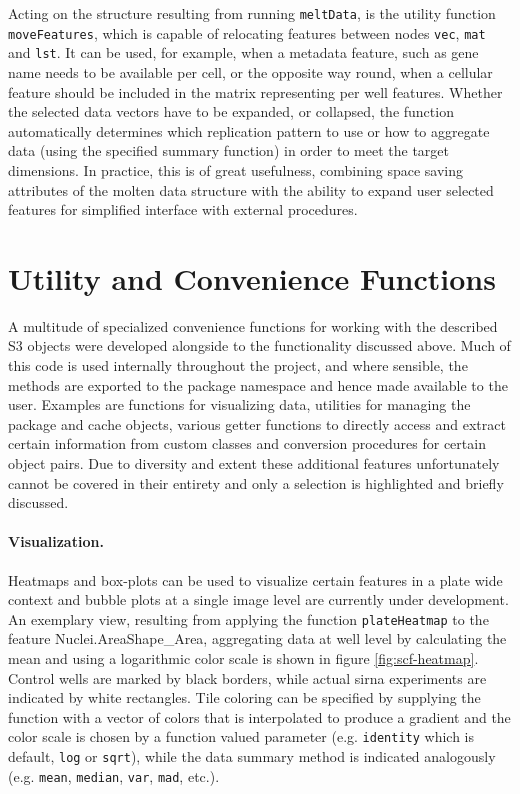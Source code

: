 Acting on the structure resulting from running \texttt{meltData}, is the utility function \texttt{moveFeatures}, which is capable of relocating features between nodes \texttt{vec}, \texttt{mat} and \texttt{lst}. It can be used, for example, when a metadata feature, such as gene name needs to be available per cell, or the opposite way round, when a cellular feature should be included in the matrix representing per well features. Whether the selected data vectors have to be expanded, or collapsed, the function automatically determines which replication pattern to use or how to aggregate data (using the specified summary function) in order to meet the target dimensions. In practice, this is of great usefulness, combining space saving attributes of the molten data structure with the ability to expand user selected features for simplified interface with external procedures.

\section{Utility and Convenience Functions}
A multitude of specialized convenience functions for working with the described S3 objects were developed alongside to the functionality discussed above. Much of this code is used internally throughout the project, and where sensible, the methods are exported to the package namespace and hence made available to the user. Examples are functions for visualizing data, utilities for managing the package and cache objects, various getter functions to directly access and extract certain information from custom classes and conversion procedures for certain object pairs. Due to diversity and extent these additional features unfortunately cannot be covered in their entirety and only a selection is highlighted and briefly discussed.

\paragraph{Visualization.}
Heatmaps and box-plots can be used to visualize certain features in a plate wide context and bubble plots at a single image level are currently under development. An exemplary view, resulting from applying the function \texttt{plateHeatmap} to the feature Nuclei.AreaShape\_Area, aggregating data at well level by calculating the mean and using a logarithmic color scale is shown in figure \ref{fig:scf-heatmap}. Control wells are marked by black borders, while actual \gls{sirna} experiments are indicated by white rectangles. Tile coloring can be specified by supplying the function with a vector of colors that is interpolated to produce a gradient and the color scale is chosen by a function valued parameter (e.g. \texttt{identity} which is default, \texttt{log} or \texttt{sqrt}), while the data summary method is indicated analogously (e.g. \texttt{mean}, \texttt{median}, \texttt{var}, \texttt{mad}, etc.).


